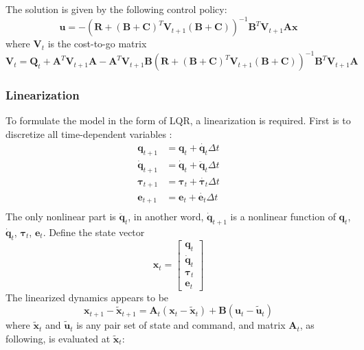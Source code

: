 The solution is given by the following control policy:
\begin{equation}
\bm{u} = -(\bm{R}+(\bm{B+C})^T\bm{V}_{t+1}(\bm{B+C}) )^{-1} \bm{B}^T\bm{V}_{t+1}\bm{Ax}
\end{equation}
where $\bm{V}_t$ is the cost-to-go matrix 
\begin{equation}
\bm{V}_t = \bm{Q}_t + \bm{A}^T\bm{V}_{t+1}\bm{A} - \bm{A}^T\bm{V}_{t+1}\bm{B}(\bm{R} + (\bm{B+C})^T\bm{V}_{t+1}(\bm{B+C}))^{-1}\bm{B}^T\bm{V}_{t+1}\bm{A}
\end{equation}

\subsubsection{Linearization}
To formulate the model in the form of LQR, a linearization is required. First is to discretize all time-dependent variables :
\begin{equation}
\begin{split}
\bm{q}_{t+1} &= \bm{q}_{t} + \dot{\bm{q}_{t}} \Delta t \\
\dot{\bm{q}}_{t+1} &= \dot{\bm{q}}_{t} + \ddot{\bm{q}}_{t} \Delta t \\
\bm{\tau}_{t+1} &= \bm{\tau}_{t} + \dot{\bm{\tau}_{t}} \Delta t \\
\bm{e}_{t+1} &= \bm{e}_{t} + \dot{\bm{e}_{t}} \Delta t \\
\end{split}
\end{equation}
The only nonlinear part is $\ddot{\bm{q}}_t$, in another word, $\dot{\bm{q}}_{t+1}$ is a nonlinear function of $\bm{q}_t$, $\dot{\bm{q}}_t$, ${\bm{\tau}}_t$, ${\bm{e}}_t$. Define the state vector 
\begin{equation}
\bm{x}_t=\left[ \begin{matrix}\bm{q}_t \\ \dot{\bm{q}}_t \\ \bm{\tau}_t \\ \bm{e}_t \end{matrix} \right]
\end{equation}
The linearized dynamics appears to be
\begin{equation}
\bm{x}_{t+1} - \tilde{\bm{x}}_{t+1} = \bm{A}_t (\bm{x}_t - \tilde{\bm{x}}_{t}) + \bm{B}(\bm{u}_t - \tilde{\bm{u}}_t)
\end{equation}
where $\tilde{\bm{x}}_t$ and $\tilde{\bm{u}}_t$ is any pair set of state and command, and matrix $\bm{A}_t$, as following, is evaluated at $\tilde{\bm{x}}_t$:
